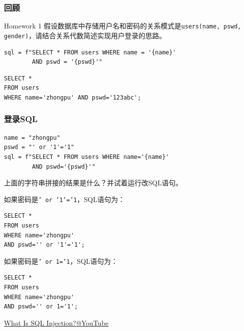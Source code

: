 \documentclass[aspectratio=169, 14pt]{beamer}
\begin{document}
\begin{frame}[fragile]
	\frametitle{回顾}
	\begin{exampleblock}{Homework 1}
		假设数据库中存储用户名和密码的关系模式是\texttt{users(name, pswd, gender)}，请结合关系代数简述实现用户登录的思路。
	\end{exampleblock}

	\begin{verbatim}
sql = f"SELECT * FROM users WHERE name = '{name}'
        AND pswd = '{pswd}'"
\end{verbatim}

	\begin{verbatim}
SELECT *
FROM users
WHERE name='zhongpu' AND pswd='123abc';
\end{verbatim}

\end{frame}

\begin{frame}[fragile]
	\frametitle{登录SQL}

	\begin{verbatim}
name = "zhongpu"
pswd = "' or '1'='1"
sql = f"SELECT * FROM users WHERE name='{name}'
        AND pswd='{pswd}'"
    \end{verbatim}

	 上面的字符串拼接的结果是什么？并试着运行改SQL语句。
\end{frame}

\begin{frame}[fragile]

	如果密码是\alert{\texttt{' or '1'='1}}，SQL语句为：

	\begin{verbatim}
SELECT * 
FROM users 
WHERE name='zhongpu' 
AND pswd='' or '1'='1';
\end{verbatim}

	\pause
	如果密码是\alert{\texttt{' or 1='1}}，SQL语句为：

	\begin{verbatim}
SELECT *
FROM users
WHERE name='zhongpu'
AND pswd='' or 1='1';
\end{verbatim}

\end{frame}

\begin{frame}
	\href{https://www.youtube.com/watch?v=wcaiKgQU6VE}{What Is SQL Injection?@YouTube}


\end{frame}
\end{document}
